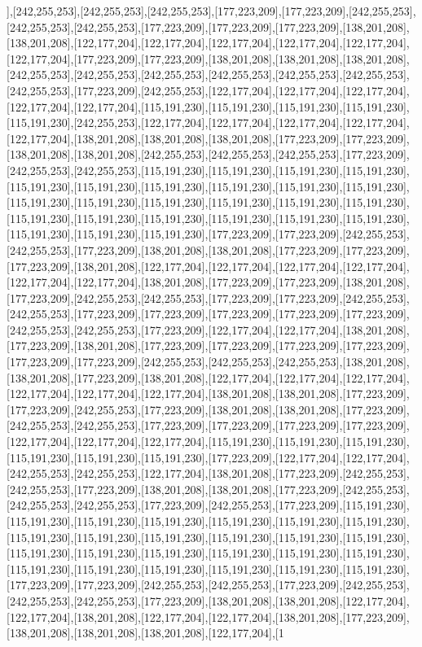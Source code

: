 ],[242,255,253],[242,255,253],[242,255,253],[177,223,209],[177,223,209],[242,255,253],[242,255,253],[242,255,253],[177,223,209],[177,223,209],[177,223,209],[138,201,208],[138,201,208],[122,177,204],[122,177,204],[122,177,204],[122,177,204],[122,177,204],[122,177,204],[177,223,209],[177,223,209],[138,201,208],[138,201,208],[138,201,208],[242,255,253],[242,255,253],[242,255,253],[242,255,253],[242,255,253],[242,255,253],[242,255,253],[177,223,209],[242,255,253],[122,177,204],[122,177,204],[122,177,204],[122,177,204],[122,177,204],[115,191,230],[115,191,230],[115,191,230],[115,191,230],[115,191,230],[242,255,253],[122,177,204],[122,177,204],[122,177,204],[122,177,204],[122,177,204],[138,201,208],[138,201,208],[138,201,208],[177,223,209],[177,223,209],[138,201,208],[138,201,208],[242,255,253],[242,255,253],[242,255,253],[177,223,209],[242,255,253],[242,255,253],[115,191,230],[115,191,230],[115,191,230],[115,191,230],[115,191,230],[115,191,230],[115,191,230],[115,191,230],[115,191,230],[115,191,230],[115,191,230],[115,191,230],[115,191,230],[115,191,230],[115,191,230],[115,191,230],[115,191,230],[115,191,230],[115,191,230],[115,191,230],[115,191,230],[115,191,230],[115,191,230],[115,191,230],[115,191,230],[177,223,209],[177,223,209],[242,255,253],[242,255,253],[177,223,209],[138,201,208],[138,201,208],[177,223,209],[177,223,209],[177,223,209],[138,201,208],[122,177,204],[122,177,204],[122,177,204],[122,177,204],[122,177,204],[122,177,204],[138,201,208],[177,223,209],[177,223,209],[138,201,208],[177,223,209],[242,255,253],[242,255,253],[177,223,209],[177,223,209],[242,255,253],[242,255,253],[177,223,209],[177,223,209],[177,223,209],[177,223,209],[177,223,209],[242,255,253],[242,255,253],[177,223,209],[122,177,204],[122,177,204],[138,201,208],[177,223,209],[138,201,208],[177,223,209],[177,223,209],[177,223,209],[177,223,209],[177,223,209],[177,223,209],[242,255,253],[242,255,253],[242,255,253],[138,201,208],[138,201,208],[177,223,209],[138,201,208],[122,177,204],[122,177,204],[122,177,204],[122,177,204],[122,177,204],[122,177,204],[138,201,208],[138,201,208],[177,223,209],[177,223,209],[242,255,253],[177,223,209],[138,201,208],[138,201,208],[177,223,209],[242,255,253],[242,255,253],[177,223,209],[177,223,209],[177,223,209],[177,223,209],[122,177,204],[122,177,204],[122,177,204],[115,191,230],[115,191,230],[115,191,230],[115,191,230],[115,191,230],[115,191,230],[177,223,209],[122,177,204],[122,177,204],[242,255,253],[242,255,253],[122,177,204],[138,201,208],[177,223,209],[242,255,253],[242,255,253],[177,223,209],[138,201,208],[138,201,208],[177,223,209],[242,255,253],[242,255,253],[242,255,253],[177,223,209],[242,255,253],[177,223,209],[115,191,230],[115,191,230],[115,191,230],[115,191,230],[115,191,230],[115,191,230],[115,191,230],[115,191,230],[115,191,230],[115,191,230],[115,191,230],[115,191,230],[115,191,230],[115,191,230],[115,191,230],[115,191,230],[115,191,230],[115,191,230],[115,191,230],[115,191,230],[115,191,230],[115,191,230],[115,191,230],[115,191,230],[115,191,230],[177,223,209],[177,223,209],[242,255,253],[242,255,253],[177,223,209],[242,255,253],[242,255,253],[242,255,253],[177,223,209],[138,201,208],[138,201,208],[122,177,204],[122,177,204],[138,201,208],[122,177,204],[122,177,204],[138,201,208],[177,223,209],[138,201,208],[138,201,208],[138,201,208],[122,177,204],[1